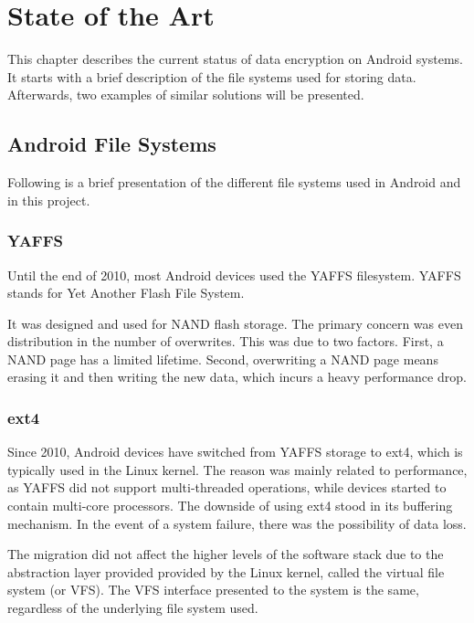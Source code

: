 \chapter{State of the Art}
\label{chapter:state}

This chapter describes the current status of data encryption on Android systems. It starts with a brief description of the file systems used for storing data. Afterwards, two examples of similar solutions will be presented.

\section{Android File Systems}
\label{sec:android-filesys}

Following is a brief presentation of the different file systems used in Android and in this project.

\subsection{YAFFS}
\label{sub-sec:yaffs}

Until the end of 2010, most Android devices used the YAFFS filesystem\cite{ext4}.
YAFFS stands for Yet Another Flash File System.

It was designed and used for NAND flash storage. The primary concern was even distribution in the number of overwrites. This was due to two factors. First, a NAND page has a limited lifetime. Second, overwriting a NAND page means erasing it and then writing the new data, which incurs a heavy performance drop.

\subsection{ext4}
\label{sub-sec:ext4}

Since 2010, Android devices have switched from YAFFS storage to ext4, which is typically used in the Linux kernel. The reason was mainly related to performance, as YAFFS did not support multi-threaded operations, while devices started to contain multi-core processors\cite{ext4}.
The downside of using ext4 stood in its buffering mechanism. In the event of a system failure, there was the possibility of data loss.

The migration did not affect the higher levels of the software stack due to the abstraction layer provided provided by the Linux kernel, called the virtual file system (or VFS). The VFS interface presented to the system is the same, regardless of the underlying file system used.

